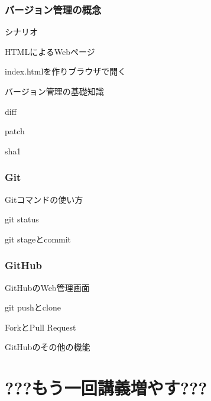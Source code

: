 \documentclass[12pt, t, aspectratio=169]{beamer}
\begin{document}
\section{バージョン管理の概念}
\label{sec-6-1}
\begin{frame}[label=sec-6-1-1]{シナリオ}
\begin{block}{HTMLによるWebページ}
\end{block}
\begin{block}{index.htmlを作りブラウザで開く}
\end{block}
\end{frame}
\begin{frame}[label=sec-6-1-2]{バージョン管理の基礎知識}
\begin{block}{diff}
\end{block}
\begin{block}{patch}
\end{block}
\begin{block}{sha1}
\end{block}
\end{frame}
\section{Git}
\label{sec-6-2}
\begin{frame}[label=sec-6-2-1]{Gitコマンドの使い方}
\end{frame}
\begin{frame}[label=sec-6-2-2]{git status}
\end{frame}
\begin{frame}[label=sec-6-2-3]{git stageとcommit}
\end{frame}
\section{GitHub}
\label{sec-6-3}
\begin{frame}[label=sec-6-3-1]{GitHubのWeb管理画面}
\end{frame}
\begin{frame}[label=sec-6-3-2]{git pushとclone}
\end{frame}
\begin{frame}[label=sec-6-3-3]{ForkとPull Request}
\end{frame}
\begin{frame}[label=sec-6-3-4]{GitHubのその他の機能}
\end{frame}
\part{???もう一回講義増やす???}
\label{sec-7}
\end{document}
